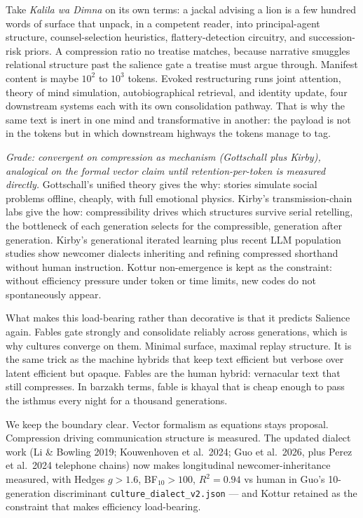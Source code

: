Take \textit{Kalila wa Dimna} on its own terms: a jackal advising a lion is a few hundred words of surface that unpack, in a competent reader, into principal-agent structure, counsel-selection heuristics, flattery-detection circuitry, and succession-risk priors. A compression ratio no treatise matches, because narrative smuggles relational structure past the salience gate a treatise must argue through. Manifest content is maybe $10^2$ to $10^3$ tokens. Evoked restructuring runs joint attention, theory of mind simulation, autobiographical retrieval, and identity update, four downstream systems each with its own consolidation pathway. That is why the same text is inert in one mind and transformative in another: the payload is not in the tokens but in which downstream highways the tokens manage to tag.

\textit{Grade: convergent on compression as mechanism (Gottschall plus Kirby), analogical on the formal vector claim until retention-per-token is measured directly.} Gottschall's unified theory gives the why: stories simulate social problems offline, cheaply, with full emotional physics. Kirby's transmission-chain labs give the how: compressibility drives which structures survive serial retelling, the bottleneck of each generation selects for the compressible, generation after generation. Kirby's generational iterated learning plus recent LLM population studies show newcomer dialects inheriting and refining compressed shorthand without human instruction. Kottur non-emergence is kept as the constraint: without efficiency pressure under token or time limits, new codes do not spontaneously appear.

What makes this load-bearing rather than decorative is that it predicts Salience again. Fables gate strongly and consolidate reliably across generations, which is why cultures converge on them. Minimal surface, maximal replay structure. It is the same trick as the machine hybrids that keep text efficient but verbose over latent efficient but opaque. Fables are the human hybrid: vernacular text that still compresses. In barzakh terms, fable is khayal that is cheap enough to pass the isthmus every night for a thousand generations.

We keep the boundary clear. Vector formalism as equations stays proposal. Compression driving communication structure is measured. The updated dialect work (Li \& Bowling 2019; Kouwenhoven et al.\ 2024; Guo et al.\ 2026, plus Perez et al.\ 2024 telephone chains) now makes longitudinal newcomer-inheritance measured, with Hedges $g>1.6$, BF$_{10}>100$, $R^2=0.94$ vs human in Guo's 10-generation discriminant \texttt{culture\_dialect\_v2.json} --- and Kottur retained as the constraint that makes efficiency load-bearing.

